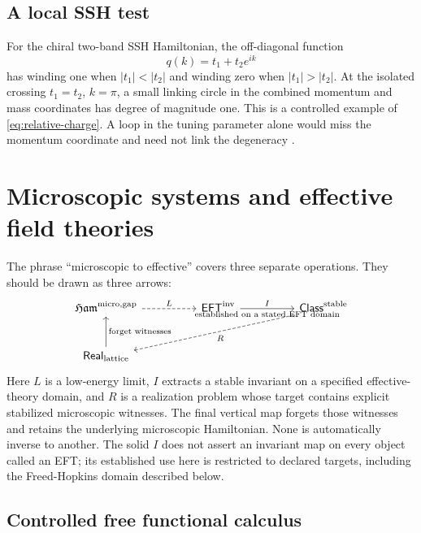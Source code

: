\documentclass[12pt]{article}
\theoremstyle{definition}
\theoremstyle{remark}
\newcommand{\Ham}{\mathfrak{Ham}}
\begin{document}
\subsection{A local SSH test}

For the chiral two-band SSH Hamiltonian, the off-diagonal function
\begin{equation}
q(k)=t_1+t_2e^{ik}
\end{equation}
has winding one when $|t_1|<|t_2|$ and winding zero when
$|t_1|>|t_2|$.  At the isolated crossing $t_1=t_2$, $k=\pi$, a small linking
circle in the combined momentum and mass coordinates has degree of magnitude
one.  This is a controlled example of \cref{eq:relative-charge}.  A loop in
the tuning parameter alone would miss the momentum coordinate and need not
link the degeneracy \cite{TeoKane2010,Thiang2016}.

\section{Microscopic systems and effective field theories}

The phrase ``microscopic to effective'' covers three separate operations.
They should be drawn as three arrows:
\begin{equation}
\begin{tikzcd}[column sep=huge,row sep=large]
\Ham^{\mathrm{micro,gap}}
  \arrow[r,dashed,"L"]
& \mathsf{EFT}^{\mathrm{inv}}
  \arrow[r,"I","\text{established on a stated EFT domain}"']
& \mathsf{Class}^{\mathrm{stable}}
  \arrow[dll,dashed,"R"] \\
\mathsf{Real}_{\mathrm{lattice}}
  \arrow[u,"\text{forget witnesses}"']
&&
\end{tikzcd}
\label{eq:three-comparisons}
\end{equation}
Here $L$ is a low-energy limit, $I$ extracts a stable invariant on a specified
effective-theory domain, and $R$ is a
realization problem whose target contains explicit stabilized microscopic
witnesses.  The final vertical map forgets those witnesses and retains the
underlying microscopic Hamiltonian.  None is automatically inverse to
another.  The solid $I$ does not assert an invariant map on every object
called an EFT; its established use here is restricted to declared targets,
including the Freed-Hopkins domain described below.

\subsection{Controlled free functional calculus}
\end{document}

